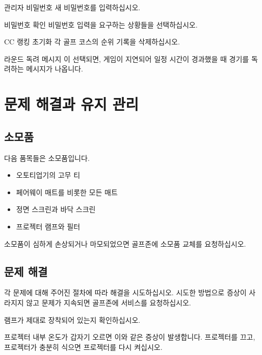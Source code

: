 \documentclass[10pt, openright, language=korean]{hzguide}
\begin{document}

\begin{UI}
\item[관리자 비밀번호] 새 비밀번호를 입력하십시오.
\item[비밀번호 확인] 비밀번호 입력을 요구하는 상황들을 선택하십시오.
\item[CC 랭킹 초기화] 각 골프 코스의 순위 기록을 삭제하십시오.
\item[라운드 독려 메시지] 이 선택되면, 게임이 지연되어 일정 시간이 경과했을 때 경기를 독려하는 메시지가 나옵니다.
\end{UI}

\chapter{문제 해결과 유지 관리}

\section{소모품}

다음 품목들은 소모품입니다. 

\begin{itemize}
\item 오토티업기의 고무 티
\item 페어웨이 매트를 비롯한 모든 매트
\item 정면 스크린과 바닥 스크린
\item 프로젝터 램프와 필터
\end{itemize}

소모품이 심하게 손상되거나 마모되었으면 골프존에 소모품 교체를 요청하십시오.

\section{문제 해결}
\label{sec:troubleshooting}

각 문제에 대해 주어진 절차에 따라 해결을 시도하십시오.
시도한 방법으로 증상이 사라지지 않고 문제가 지속되면 골프존에 서비스를 요청하십시오.

램프가 제대로 장착되어 있는지 확인하십시오.

프로젝터 내부 온도가 갑자기 오르면 이와 같은 증상이 발생합니다.
프로젝터를 끄고, 프로젝터가 충분히 식으면 프로젝터를 다시 켜십시오.

\end{document}
